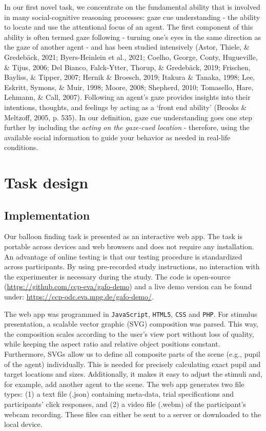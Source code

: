 \documentclass[
  man,floatsintext]{apa6}
\begin{document}
In our first novel task, we concentrate on the fundamental ability that is involved in many social-cognitive reasoning processes:
gaze cue understanding - the ability to locate and use the attentional focus of an agent.
The first component of this ability is often termed gaze following - turning one's eyes in the same direction as the gaze of another agent - and has been studied intensively (Astor, Thiele, \& Gredebäck, 2021; Byers-Heinlein et al., 2021; Coelho, George, Conty, Hugueville, \& Tijus, 2006; Del Bianco, Falck-Ytter, Thorup, \& Gredebäck, 2019; Frischen, Bayliss, \& Tipper, 2007; Hernik \& Broesch, 2019; Itakura \& Tanaka, 1998; Lee, Eskritt, Symons, \& Muir, 1998; Moore, 2008; Shepherd, 2010; Tomasello, Hare, Lehmann, \& Call, 2007).
Following an agent's gaze provides insights into their intentions, thoughts, and feelings by acting as a `front end ability' (Brooks \& Meltzoff, 2005, p. 535).
In our definition, gaze cue understanding goes one step further by including the \emph{acting on the gaze-cued location} - therefore, using the available social information to guide your behavior as needed in real-life conditions.

\hypertarget{task-design}{%
\section{Task design}\label{task-design}}

\hypertarget{implementation}{%
\subsection{Implementation}\label{implementation}}

Our balloon finding task is presented as an interactive web app. The task is portable across devices and web browsers and does not require any installation. An advantage of online testing is that our testing procedure is standardized across participants. By using pre-recorded study instructions, no interaction with the experimenter is necessary during the study. The code is open-source (\url{https://github.com/ccp-eva/gafo-demo}) and a live demo version can be found under: \url{https://ccp-odc.eva.mpg.de/gafo-demo/}.

The web app was programmed in \texttt{JavaScript}, \texttt{HTML5}, \texttt{CSS} and \texttt{PHP}. For stimulus presentation, a scalable vector graphic (SVG) composition was parsed. This way, the composition scales according to the user's view port without loss of quality, while keeping the aspect ratio and relative object positions constant. Furthermore, SVGs allow us to define all composite parts of the scene (e.g., pupil of the agent) individually. This is needed for precisely calculating exact pupil and target locations and sizes. Additionally, it makes it easy to adjust the stimuli and, for example, add another agent to the scene. The web app generates two file types: (1) a text file (.json) containing meta-data, trial specifications and participants' click responses, and (2) a video file (.webm) of the participant's webcam recording. These files can either be sent to a server or downloaded to the local device.
\end{document}
